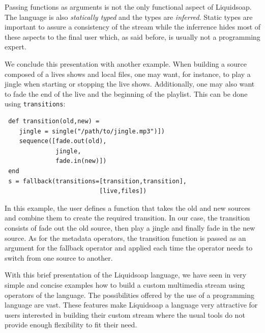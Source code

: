 \documentclass{llncs}
\newcommand{\liquidsoap}{Liquidsoap}
\begin{document}
Passing functions as arguments is not the only functional aspect of \liquidsoap{}. The language is 
also \textit{statically typed} and the types are \textit{inferred}. Static types are important to 
assure a consistency of the stream while the inferrence hides most of these aspects to 
the final user which, as said before, is usually not a programming expert.

We conclude this presentation with another example. When building a source composed
of a lives shows and local files, one may want, for instance, to play a jingle when starting
or stopping the live shows. Additionally, one may also want to fade the 
end of the live and the beginning of the playlist. This can be done using \texttt{transitions}:
\begin{verbatim}
 def transition(old,new) = 
    jingle = single("/path/to/jingle.mp3")])
    sequence([fade.out(old), 
              jingle, 
              fade.in(new)])
 end
 s = fallback(transitions=[transition,transition], 
                          [live,files])
\end{verbatim}
In this example, the user defines a function that takes the old and new sources and combine them
to create the required transition. In our case, the transition consists of fade out the old 
source, then play a jingle and finally fade in the new source. As for the metadata operators,
the transition function is passed as an argument for the fallback operator and applied 
each time the operator needs to switch from one source to another.

With this brief presentation of the \liquidsoap{} language, we have seen in very simple and 
concise examples how to build a custom multimedia stream using operators of the language. 
The possibilities offered by the use of a programming 
language are vast. These features make \liquidsoap{} a language very attractive for users
interested in building their custom stream where the usual tools do not provide 
enough flexibility to fit their need.


\end{document}
